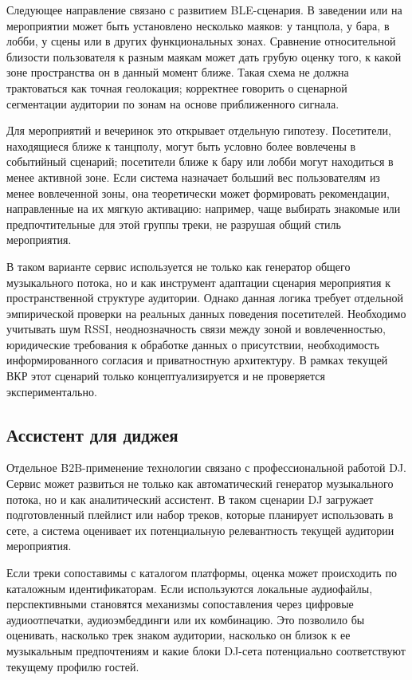 Следующее направление связано с развитием BLE-сценария. В заведении или на мероприятии может быть установлено несколько маяков: у танцпола, у бара, в лобби, у сцены или в других функциональных зонах. Сравнение относительной близости пользователя к разным маякам может дать грубую оценку того, к какой зоне пространства он в данный момент ближе. Такая схема не должна трактоваться как точная геолокация; корректнее говорить о сценарной сегментации аудитории по зонам на основе приближенного сигнала.

Для мероприятий и вечеринок это открывает отдельную гипотезу. Посетители, находящиеся ближе к танцполу, могут быть условно более вовлечены в событийный сценарий; посетители ближе к бару или лобби могут находиться в менее активной зоне. Если система назначает больший вес пользователям из менее вовлеченной зоны, она теоретически может формировать рекомендации, направленные на их мягкую активацию: например, чаще выбирать знакомые или предпочтительные для этой группы треки, не разрушая общий стиль мероприятия.

В таком варианте сервис используется не только как генератор общего музыкального потока, но и как инструмент адаптации сценария мероприятия к пространственной структуре аудитории. Однако данная логика требует отдельной эмпирической проверки на реальных данных поведения посетителей. Необходимо учитывать шум RSSI, неоднозначность связи между зоной и вовлеченностью, юридические требования к обработке данных о присутствии, необходимость информированного согласия и приватностную архитектуру. В рамках текущей ВКР этот сценарий только концептуализируется и не проверяется экспериментально.

\subsection{Ассистент для диджея}
\label{subsec:ch6:dj-assistant}

Отдельное B2B-применение технологии связано с профессиональной работой DJ. Сервис может развиться не только как автоматический генератор музыкального потока, но и как аналитический ассистент. В таком сценарии DJ загружает подготовленный плейлист или набор треков, которые планирует использовать в сете, а система оценивает их потенциальную релевантность текущей аудитории мероприятия.

Если треки сопоставимы с каталогом платформы, оценка может происходить по каталожным идентификаторам. Если используются локальные аудиофайлы, перспективными становятся механизмы сопоставления через цифровые аудиоотпечатки, аудиоэмбеддинги или их комбинацию. Это позволило бы оценивать, насколько трек знаком аудитории, насколько он близок к ее музыкальным предпочтениям и какие блоки DJ-сета потенциально соответствуют текущему профилю гостей.

